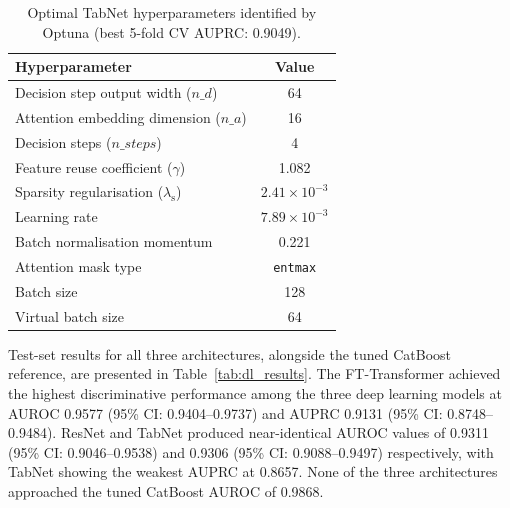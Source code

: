 \documentclass[final,3p,times]{elsarticle}
\begin{document}
\begin{table}[H]
\centering
\caption{Optimal TabNet hyperparameters identified by Optuna
(best 5-fold CV AUPRC: 0.9049).}
\label{tab:tabnet_hyperparams}
\small
\begin{tabular}{lc}
\toprule
\textbf{Hyperparameter} & \textbf{Value} \\
\midrule
Decision step output width ($n\_d$)             & 64 \\
Attention embedding dimension ($n\_a$)          & 16 \\
Decision steps ($n\_steps$)                     & 4 \\
Feature reuse coefficient ($\gamma$)            & 1.082 \\
Sparsity regularisation ($\lambda_{\text{s}}$)  & $2.41 \times 10^{-3}$ \\
Learning rate                                   & $7.89 \times 10^{-3}$ \\
Batch normalisation momentum                    & 0.221 \\
Attention mask type                             & \texttt{entmax} \\
Batch size                                      & 128 \\
Virtual batch size                              & 64 \\
\bottomrule
\end{tabular}
\end{table}

Test-set results for all three architectures, alongside the tuned
CatBoost reference, are presented in Table~\ref{tab:dl_results}.
The FT-Transformer achieved the highest discriminative performance
among the three deep learning models at AUROC 0.9577 (95\% CI:
0.9404--0.9737) and AUPRC 0.9131 (95\% CI: 0.8748--0.9484).
ResNet and TabNet produced near-identical AUROC values of 0.9311
(95\% CI: 0.9046--0.9538) and 0.9306 (95\% CI: 0.9088--0.9497)
respectively, with TabNet showing the weakest AUPRC at 0.8657.
None of the three architectures approached the tuned CatBoost
AUROC of 0.9868.
\end{document}
